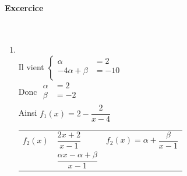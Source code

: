 \newpage 


\paragraph{Excercice } ~\\


\begin{enumerate}
\renewcommand{\theenumi}{\arabic{enumi})}

\item {}\\

Il vient \raisebox{-2ex}
          {$\left\lbrace
             \begin{array}{rl}
                    \alpha \!\!\!\!\!\!\!\!& = 2   \\
          - 4\alpha +\beta \!\!\!\!\!\!\!\!& = -10 \\        
            \end{array}
            \right.$}\\ 

Donc \raisebox{-2ex}
          {$\begin{array}{rl}
                    \alpha \!\!\!\!\!\!\!\!& =  2 \\
                    \beta  \!\!\!\!\!\!\!\!& = -2 \\        
             \end{array}$}\\             
            
Ainsi $ f_1(x) = 2 -\dfrac{2}{x - 4}$ \\

\bigskip 
            
{\renewcommand{\arraystretch }{1.75}
\begin{tabular}{r@{$\;=\;$ }l@{$\qquad \qquad$ }l}
$f_2(x)$ & $ \dfrac{2x +2}{x - 1}$ 
                        & $ f_2(x) = \alpha + \dfrac{\beta}{x - 1}$ \\
         & $ \dfrac{\alpha x - \alpha  +\beta}{x - 1}$  &               \\
\end{tabular}}\\


\end{enumerate}

